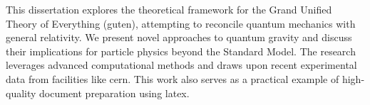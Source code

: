 This dissertation explores the theoretical framework for the Grand Unified Theory of Everything (\gls{guten}), attempting to reconcile quantum mechanics with general relativity. We present novel approaches to quantum gravity and discuss their implications for particle physics beyond the Standard Model. The research leverages advanced computational methods and draws upon recent experimental data from facilities like \gls{cern}. This work also serves as a practical example of high-quality document preparation using \gls{latex}.

